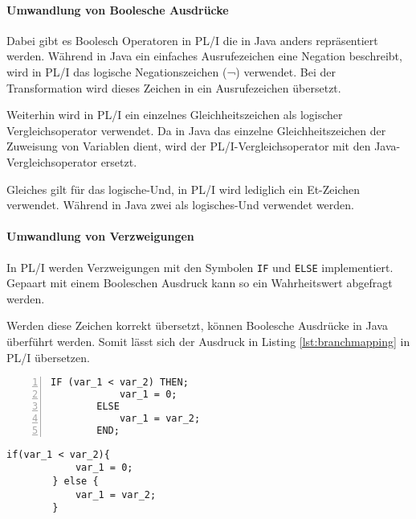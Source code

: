 \paragraph{Umwandlung von Boolesche Ausdrücke}

Dabei gibt es Boolesch Operatoren in PL/I die in Java anders repräsentiert werden.
Während in Java ein einfaches Ausrufezeichen eine Negation beschreibt, wird in PL/I das logische Negationszeichen (¬) verwendet. Bei der Transformation wird dieses Zeichen in ein Ausrufezeichen übersetzt.


Weiterhin wird in PL/I ein einzelnes Gleichheitszeichen als logischer Vergleichsoperator verwendet. Da in Java das einzelne Gleichheitszeichen der Zuweisung von Variablen dient, wird der PL/I-Vergleichsoperator mit den Java-Vergleichsoperator ersetzt.

Gleiches gilt für das logische-Und, in PL/I wird lediglich ein Et-Zeichen verwendet. Während in Java zwei als logisches-Und verwendet werden.


\paragraph{Umwandlung von Verzweigungen}

In PL/I werden Verzweigungen mit den Symbolen \verb+IF+ und \verb+ELSE+ implementiert. 
Gepaart mit einem Booleschen Ausdruck kann so ein Wahrheitswert abgefragt werden.

Werden diese Zeichen korrekt übersetzt, können Boolesche Ausdrücke in Java überführt werden.
Somit lässt sich der Ausdruck in Listing \ref{lst:branchmapping} in PL/I übersetzen.

\begin{minipage}[b]{0.48\linewidth}
	\centering
	\lstset{language=PL/I,label=SliceExaple}
	\begin{lstlisting}[frame=single, numbers=left, mathescape,%
		caption={Verzweigungen}, label={lst:branchmapping}]	
		IF (var_1 < var_2) THEN;
			var_1 = 0;
		ELSE
			var_1 = var_2;
		END;
	\end{lstlisting}
\end{minipage}
\hspace{0.5cm}
\begin{minipage}[b]{0.48\linewidth}
	\centering
	\lstset{language=Java,label=SliceExaple}
	\begin{lstlisting}[frame=single, mathescape,%
		title={" "}]
		if(var_1 < var_2){
			var_1 = 0;	
		} else {
			var_1 = var_2;
		}
	\end{lstlisting}
\end{minipage} 

